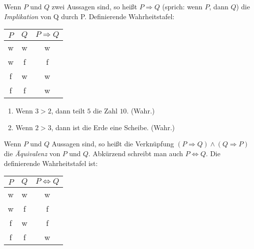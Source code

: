 \begin{frame}
\begin{mydef}
Wenn $P$ und $Q$ zwei Aussagen sind, so heißt $P \Rightarrow Q$
(sprich: wenn $P$, dann $Q$) die \textit{Implikation} von Q durch P.
Definierende Wahrheitstafel:

\begin{table}[H]
\centering
\begin{tabular}{c|c|c}
$P$ & $Q$ & $P \Rightarrow Q$ \\ \hline
w   & w   & w \\
w   & f   & f \\
f   & w   & w \\
f   & f   & w
\end{tabular}
\end{table}
\end{mydef}

\begin{example}
\begin{enumerate}
\item Wenn $ 3 > 2$, dann teilt $5$ die Zahl $10$. (Wahr.)
\item Wenn $2 > 3$, dann ist die Erde eine Scheibe. (Wahr.)
\end{enumerate}
\end{example}
\end{frame}


\begin{frame}
\begin{mydef}
Wenn $P$ und $Q$ Aussagen sind, so heißt die Verknüpfung
$(P \Rightarrow Q) \wedge (Q \Rightarrow P)$ die \textit{Äquivalenz} von
$P$ und $Q$.
Abkürzend schreibt man auch $P \iff Q$.
Die definierende Wahrheitstafel ist:

\begin{table}[H]
\centering
\begin{tabular}{c|c|c}
$P$ & $Q$ & $P \iff Q$ \\ \hline
w   & w   & w \\
w   & f   & f \\
f   & w   & f \\
f   & f   & w
\end{tabular}
\end{table}
\end{mydef}
\end{frame}
